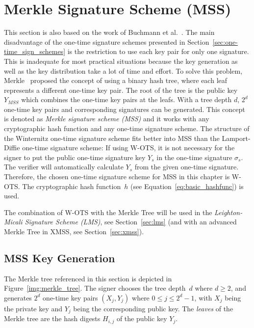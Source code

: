 \section{Merkle Signature Scheme (MSS)} 
\label{sec:mss}
This section is also based on the work of Buchmann et al.~\cite{book_pqc_bernstein_2004}.
The main disadvantage of the one-time signature schemes presented in Section~\ref{sec:one-time_sign_schemes} is the restriction to use each key pair for only one signature. This is inadequate for most practical situations because the key generation as well as the key distribution take a lot of time and effort.
To solve this problem, Merkle~\cite{cha:bg_merkletrees_Merkle_1979} proposed the concept of using a binary hash tree, where each leaf represents a different one-time key pair. The root of the tree is the public key $Y_{MSS}$  which combines the one-time key pairs at the leafs. With a tree depth $d$, $2^d$ one-time key pairs and corresponding signatures can be generated. 
This concept is denoted as \textit{Merkle signature scheme (MSS)} and it works with any cryptographic hash function and any one-time signature scheme. 
The structure of the Winternitz one-time signature scheme fits better into MSS than the Lamport-Diffie one-time signature scheme: If using W-OTS, it is not necessary for the signer to put the public one-time signature key $Y_s$ in the one-time signature $\sigma_s$. The verifier will automatically calculate $Y_s$ from the given one-time signature. Therefore, the chosen one-time signature scheme for MSS in this chapter is W-OTS. The cryptographic hash function~$h$ (see Equation~\ref{eq:basic_hashfunc}) is used. 

The combination of W-OTS with the Merkle Tree will be used in the \textit{Leighton-Micali Signature Scheme (LMS)}, see Section~\ref{sec:lms} (and with an advanced Merkle Tree in XMSS, see Section~\ref{sec:xmss}).

\subsection{MSS Key Generation}
\label{cha:mss_keygen}
The Merkle tree referenced in this section is depicted in Figure~\ref{img:merkle_tree}.
The signer chooses the tree depth~$d$ where $d \geq 2$, and generates $2^d$ one-time key pairs $(X_j, Y_j)$ where $0 \leq j \leq 2^d-1$, with $X_j$ being the private key and $Y_j$ being the corresponding public key. The \textit{leaves} of the Merkle tree are the hash digests $H_{i,j}$ of the public key $Y_j$. 

